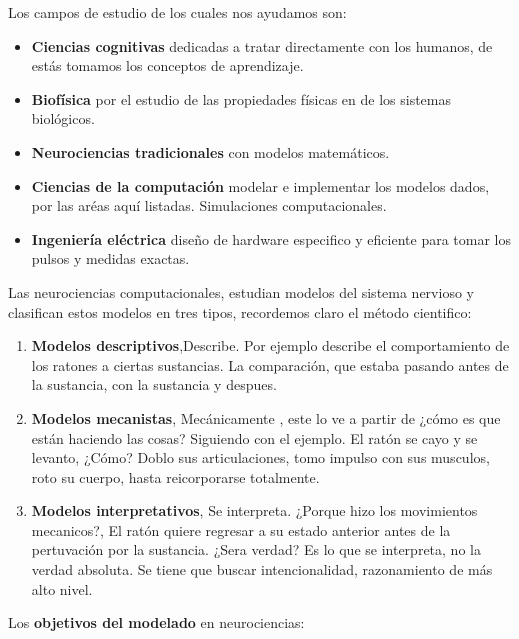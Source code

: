 \documentclass{article}
\begin{document}
Los campos de estudio de los cuales nos ayudamos son:
\begin{itemize}
 \item  \textbf{Ciencias cognitivas} dedicadas a tratar directamente con los humanos, de estás tomamos los conceptos de aprendizaje.
 \item  \textbf{Biofísica}  por el estudio de las propiedades físicas en de los sistemas biológicos. 
 \item  \textbf{Neurociencias tradicionales} con modelos matemáticos. 
 
 \item  \textbf{Ciencias de la computación} modelar e implementar los modelos dados, por las aréas aquí listadas. Simulaciones computacionales. 
 
 \item  \textbf{Ingeniería eléctrica} diseño de hardware especifico y eficiente para tomar los pulsos y medidas exactas.  
 
\end{itemize}

Las neurociencias computacionales, estudian modelos del sistema nervioso y clasifican estos modelos en tres tipos, recordemos claro el método cientifico: 

\begin{enumerate}
 \item \textbf{Modelos descriptivos},Describe. Por ejemplo describe el comportamiento de los ratones a ciertas sustancias. La comparación, que estaba pasando antes de la sustancia, con la sustancia y despues. 
  
 \item \textbf{Modelos mecanistas}, Mecánicamente %
 , este lo ve a partir de  ¿cómo es que están haciendo las cosas? Siguiendo con el ejemplo. El ratón se cayo y se levanto, ¿Cómo? Doblo sus articulaciones, tomo impulso con sus musculos, roto su cuerpo, hasta reicorporarse totalmente.
 
 \item \textbf{Modelos interpretativos}, Se interpreta. ¿Porque hizo los movimientos mecanicos?, El ratón quiere regresar a su estado anterior antes de la pertuvación por la sustancia. ¿Sera verdad? Es lo que se interpreta, no la verdad absoluta. Se tiene que buscar intencionalidad, razonamiento de más alto nivel.
\end{enumerate}

Los \textbf{objetivos del modelado} en neurociencias:

\end{document}
